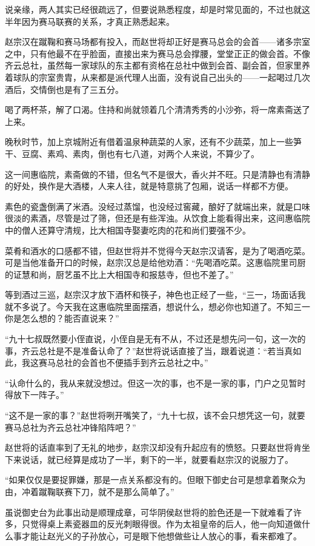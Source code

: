 说亲缘，两人其实已经很疏远了，但要说熟悉程度，却是时常见面的，不过也就这半年因为赛马联赛的关系，才真正熟悉起来。

赵宗汉在蹴鞠和赛马场都有投入，而赵世将却正好是赛马总会的会首——诸多宗室之中，只有他最不在乎脸面，直接出来为赛马总会撑腰，堂堂正正的做会首。不像齐云总社，虽然每一家球队的东主都有资格在总社中做到会首、副会首，但家里养着球队的宗室贵胄，从来都是派代理人出面，没有说自己出头的——一起喝过几次酒后，交情倒也是有了三五分。

喝了两杯茶，解了口渴。住持和尚就领着几个清清秀秀的小沙弥，将一席素斋送了上来。

晚秋时节，加上京城附近有借着温泉种蔬菜的人家，还有不少蔬菜，加上一些笋干、豆腐、素鸡、素肉，倒也有七八道，对两个人来说，不算少了。

这一间惠临院，素斋做的不错，但名气不是很大，香火并不旺。只是清静也有清静的好处，换作是大酒楼，人来人往，就是特意挑了包厢，说话一样都不方便。

素色的瓷盏倒满了米酒。没经过蒸馏，也没经过窖藏，酿好了就端出来，就是口味很淡的素酒，尽管是过了筛，但还是有些浑浊。从饮食上能看得出来，这间惠临院中的僧人还算守清规，比大相国寺娶妻吃肉的花和尚们要强不少。

菜肴和酒水的口感都不错，但赵世将并不觉得今天赵宗汉请客，是为了喝酒吃菜。可是当他准备开口的时候，赵宗汉总是给他劝酒：“先喝酒吃菜。这惠临院里司厨的证慧和尚，厨艺虽不比上大相国寺和报慈寺，但也不差了。”

等到酒过三巡，赵宗汉才放下酒杯和筷子，神色也正经了一些，“三一，场面话我就不多说了。今天我在这惠临院里面摆酒，想说什么，想必你也知道了。不知三一你是怎么想的？能否直说来？”

“九十七叔既然要小侄直说，小侄自是无有不从，不过还是想先问一句，这一次的事，齐云总社是不是准备认命了？”赵世将说话直接了当，跟着说道：“若当真如此，我这赛马总社的会首也不便插手到齐云总社之中。”

“认命什么的，我从来就没想过。但这一次的事，也不是一家的事，门户之见暂时得放下一阵子。”

“这不是一家的事？”赵世将咧开嘴笑了，“九十七叔，该不会只想凭这一句，就要赛马总社为齐云总社冲锋陷阵吧？”

赵世将的话直率到了无礼的地步，赵宗汉却没有升起应有的愤怒。只要赵世将肯坐下来说话，就已经算是成功了一半，剩下的一半，就要看赵宗汉的说服力了。

“如果仅仅是要捉罪嫌，那是一点关系都没有的。但眼下御史台可是想拿着聚众为由，冲着蹴鞠联赛下刀，就不是那么简单了。”

虽说御史台为此事出动是顺理成章，可华阴侯赵世将的脸色还是一下就难看了许多，只觉得桌上素瓷器皿的反光刺眼得很。作为太祖皇帝的后人，他一向知道做什么事才能让赵光义的子孙放心，可是眼下他想做些让人放心的事，看来都难了。


